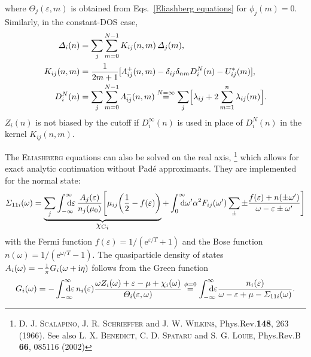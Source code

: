 \documentclass[a4paper]{article}
\let\Im\relax
\DeclareMathOperator\Im{Im}
\def\D{\mathrm d}
\def\E{\mathrm e}
\def\I{\mathrm i}
\def\sub#1{\sb{\mathrm{#1}}}
\def\from#1{\sb{\mathrlap{#1}}}
\def\till#1{\sp{\mathrlap{#1}}}
\let\Delta\varDelta
\let\epsilon\varepsilon
\let\Lambda\varLambda
\let\Sigma\varSigma
\let\Theta\varTheta
\newlength\gap
\begin{document}
   where $\Theta_j(\epsilon, m)$ is obtained from Eqs.~\ref{Eliashberg
   equations} for $\phi_j(m) = 0$. Similarly, in the constant-DOS case,
   \begin{equation}
      \begin{split}
         \Delta_i(n) &= \sum_j \sum_{m = 0}^{N - 1}
         K_{i j}(n, m) \, \Delta_j(m),
         \\
         K_{i j}(n, m) &= \frac 1 {2 m + 1} [\Lambda_{i j}^+(n, m)
         - \delta_{i j} \delta_{n m} D_i^N(n) - U^*_{i j}(m)],
         \\
         D_i^N(n) &= \sum_j \sum_{m = 0}^{N - 1} \Lambda_{i j}^-(n, m)
         \overset{N = \infty} =
         \sum_j \Bigl[ \lambda_{i j} + 2 \sum_{m = 1}^n \lambda_{i j}(m) \Bigr].
      \end{split}
      \label{linearized gap equation}
   \end{equation}
   $Z_i(n)$ is not biased by the cutoff if $D_i^\infty(n)$ is used in place of
   $D_i^N(n)$ in the kernel $K_{i j}(n, m)$.

   The \textsc{Eliashberg} equations can also be solved on the real axis,%
   \footnote{%
      D. J. \textsc{Scalapino}, J. R. \textsc{Schrieffer} and J. W.
      \textsc{Wilkins}, Phys.\@  Rev.\@ \textbf{148}, 263 (1966).
      \newline
      See also L. X. \textsc{Benedict}, C. D. \textsc{Spataru} and S. G.
      \textsc{Louie}, Phys.\@ Rev.\@ B \textbf{66}, 085116 (2002)
      }
   which allows for exact analytic continuation without Padé approximants. They
   are implemented for the normal state:
   \begin{equation}
      \varSigma_{1 1 i}(\omega) = \underbrace{
      \sum_j
      \int \from{-\infty} \till \infty \D \epsilon \,
      \frac{A_j(\epsilon)}{n_j(\mu_0)}
      \Biggl[
         \mu_{i j}
         \biggl( \frac12 - f(\epsilon) \biggr)
            }_{\displaystyle {\chi \sub C}_i}
         + \int \from 0 \till \infty \D \omega'
         \alpha^2 F_{i j}(\omega')
         \sum_\pm \pm \frac{f(\epsilon) + n(\pm \omega')}
            {\omega - \epsilon \pm \omega'}
      \Biggr]
      \label{real-axis equations}
   \end{equation}
   with the Fermi function $f(\epsilon) = 1 / (\E^{\epsilon / T} + 1)$ and the
   Bose function $n(\omega) = 1 / (\E^{\omega / T} - 1)$. The quasiparticle
   density of states $A_i(\omega) = -\frac 1 \pi \Im G_i(\omega + \I \eta)$
   follows from the Green function
   \begin{equation*}
      G_i(\omega) =
      -\int \from{-\infty} \till \infty \D \epsilon \,
      n_i(\epsilon)
      \frac{\omega Z_i(\omega)
         + \epsilon - \mu + \chi_i(\omega)}
         {\Theta_i(\epsilon, \omega)}
      \overset{\phi = 0} =
      \int \from{-\infty} \till \infty \D \epsilon
      \frac{n_i(\epsilon)}
         {\omega - \epsilon + \mu - \Sigma_{1 1 i}(\omega)}.
   \end{equation*}
\end{document}
